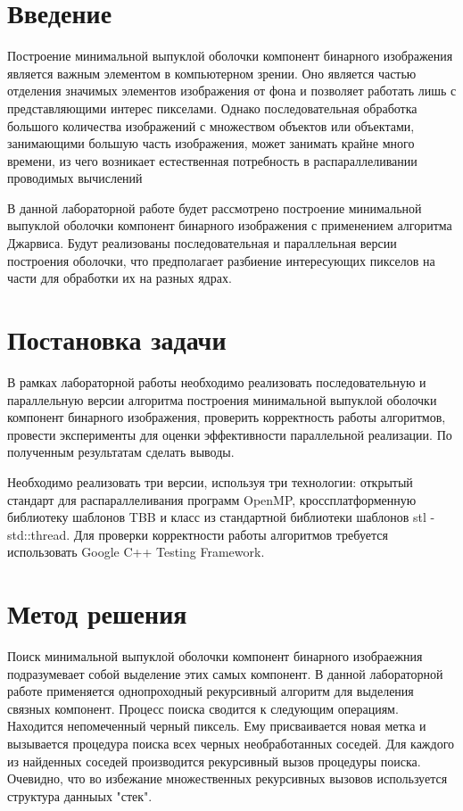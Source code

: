 \documentclass{report}
\begin{document}
\setcounter{page}{2}

\tableofcontents
\newpage

\section*{Введение}
Построение минимальной выпуклой оболочки компонент бинарного изображения является важным элементом в компьютерном зрении. Оно является частью отделения значимых элементов изображения от фона и позволяет работать лишь с представляющими интерес пикселами. Однако последовательная обработка большого количества изображений с множеством объектов или объектами, занимающими большую часть изображения, может занимать крайне много времени, из чего возникает естественная потребность в распараллеливании проводимых вычислений
\par В данной лабораторной работе будет рассмотрено построение минимальной выпуклой оболочки компонент бинарного изображения с применением алгоритма Джарвиса. Будут реализованы последовательная и параллельная версии построения оболочки, что предполагает разбиение интересующих пикселов на части для обработки их на разных ядрах.
\newpage

\section*{Постановка задачи}
В рамках лабораторной работы необходимо реализовать последовательную и параллельную версии алгоритма построения минимальной выпуклой оболочки компонент бинарного изображения, проверить корректность работы алгоритмов, провести эксперименты для оценки эффективности параллельной реализации. По полученным результатам сделать выводы.
\par Необходимо реализовать три версии, используя три технологии:  открытый стандарт для распараллеливания программ OpenMP, кроссплатформенную библиотеку шаблонов TBB и класс из стандартной библиотеки шаблонов stl - std::thread. Для проверки корректности работы алгоритмов требуется использовать Google C++ Testing Framework.
\newpage

\section*{Метод решения}
\par Поиск минимальной выпуклой оболочки компонент бинарного изобраежния подразумевает собой выделение этих самых компонент. В данной лабораторной работе применяется однопроходный рекурсивный алгоритм для выделения связных компонент. Процесс поиска сводится к следующим операциям. Находится непомеченный черный пиксель. Ему присваивается новая метка и вызывается процедура поиска всех черных необработанных соседей. Для каждого из найденных соседей производится рекурсивный вызов процедуры поиска. Очевидно, что во избежание множественных рекурсивных вызовов используется структура данныых "стек".
\end{document}
